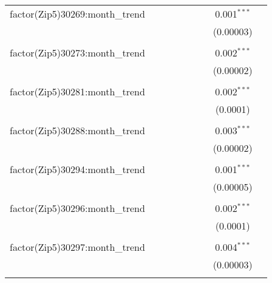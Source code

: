 \begin{table}[H]
{\begin{tabular}{@{\extracolsep{5pt}}lcccccccc}
  factor(Zip5)30269:month\_trend &  &  &  &  &  &  & 0.001$^{***}$ &  \\  

   &  &  &  &  &  &  & (0.00003) &  \\  

   & & & & & & & & \\  

  factor(Zip5)30273:month\_trend &  &  &  &  &  &  & 0.002$^{***}$ &  \\  

   &  &  &  &  &  &  & (0.00002) &  \\  

   & & & & & & & & \\  

  factor(Zip5)30281:month\_trend &  &  &  &  &  &  & 0.002$^{***}$ &  \\  

   &  &  &  &  &  &  & (0.0001) &  \\  

   & & & & & & & & \\  

  factor(Zip5)30288:month\_trend &  &  &  &  &  &  & 0.003$^{***}$ &  \\  

   &  &  &  &  &  &  & (0.00002) &  \\  

   & & & & & & & & \\  

  factor(Zip5)30294:month\_trend &  &  &  &  &  &  & 0.001$^{***}$ &  \\  

   &  &  &  &  &  &  & (0.00005) &  \\  

   & & & & & & & & \\  

  factor(Zip5)30296:month\_trend &  &  &  &  &  &  & 0.002$^{***}$ &  \\  

   &  &  &  &  &  &  & (0.0001) &  \\  

   & & & & & & & & \\  

  factor(Zip5)30297:month\_trend &  &  &  &  &  &  & 0.004$^{***}$ &  \\  

   &  &  &  &  &  &  & (0.00003) &  \\  

   & & & & & & & & \\  


\end{tabular}}
\end{table}
